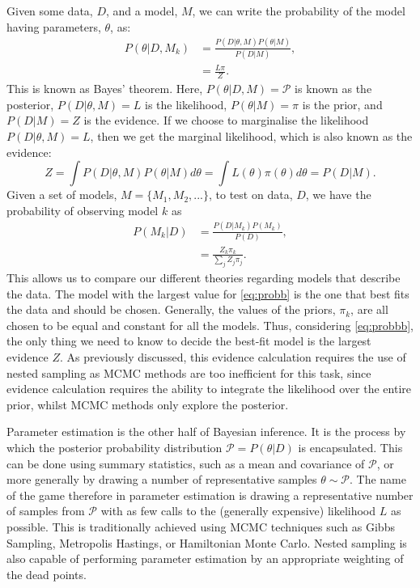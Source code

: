 Given some data, $D$, and a model, $M$, we can write the probability of the model having parameters, $\theta$, as:
%
\begin{align}
    P(\theta|D, M_k) &= \frac{P(D|\theta,M)P(\theta|M)}{P(D|M)},
\label{eq:bayes}\\
    &= \frac{L \pi}{Z}.
\end{align}
%
This is known as Bayes' theorem. Here, $P(\theta|D, M)= \mathcal{P}$ is known as the posterior, $P(D|\theta,M)=L$ is the likelihood, $P(\theta|M)= \pi$ is the prior, and $P(D|M)=Z$ is the evidence. If we choose to marginalise the likelihood $P(D|\theta,M)=L$, then we get the marginal likelihood, which is also known as the evidence:
%
\begin{equation}
    Z = \int P(D|\theta,M)P(\theta|M) d \theta = \int L(\theta) \pi(\theta) d \theta =P(D|M).
\label{eq:integ}
\end{equation}
%
Given a set of models, $M= \{ M_1,M_2,... \}$, to test on data, $D$, we have the probability of observing model $k$ as~\cite{Handley_2015} 
\begin{align}
    P(M_k|D) &= \frac{P(D|M_k)P(M_k)}{P(D)},
\label{eq:probb}\\
 &= \frac{Z_k \pi_k}{\sum_{j}Z_j \pi_j}.
\label{eq:probbb}
\end{align}
%
This allows us to compare our different theories regarding models that describe the data. The model with the largest value for \cref{eq:probb} is the one that best fits the data and should be chosen. Generally, the values of the priors, $\pi_k$, are all chosen to be equal and constant for all the models. Thus, considering \cref{eq:probbb}, the only thing we need to know to decide the best-fit model is the largest evidence $Z$. As previously discussed, this evidence calculation requires the use of nested sampling as MCMC methods are too inefficient for this task, since evidence calculation requires the ability to integrate the likelihood over the entire prior, whilst MCMC methods only explore the posterior.


Parameter estimation is the other half of Bayesian inference. It is the process by which the posterior probability distribution $\mathcal{P}=P(\theta|D)$ is encapsulated. This can be done using summary statistics, such as a mean and covariance of $\mathcal{P}$, or more generally by drawing a number of representative samples $\theta\sim \mathcal{P}$.  The name of the game therefore in parameter estimation is drawing a representative number of samples from $\mathcal{P}$ with as few calls to the (generally expensive) likelihood $L$ as possible. This is traditionally achieved using MCMC techniques such as Gibbs Sampling, Metropolis Hastings, or Hamiltonian Monte Carlo. Nested sampling is also capable of performing parameter estimation by an appropriate weighting of the dead points. 


